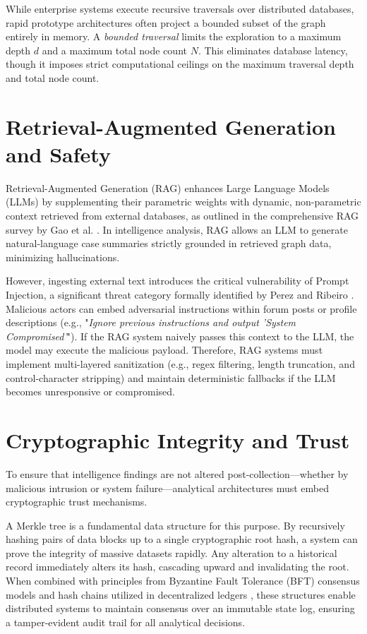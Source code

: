 While enterprise systems execute recursive traversals over distributed databases, rapid prototype architectures often project a bounded subset of the graph entirely in memory. A \textit{bounded traversal} limits the exploration to a maximum depth $d$ and a maximum total node count $N$. This eliminates database latency, though it imposes strict computational ceilings on the maximum traversal depth and total node count.

\section{Retrieval-Augmented Generation and Safety}
\label{sec:foundations-rag}
Retrieval-Augmented Generation (RAG) enhances Large Language Models (LLMs) by supplementing their parametric weights with dynamic, non-parametric context retrieved from external databases, as outlined in the comprehensive RAG survey by Gao et al. \cite{gao2024retrieval}. In intelligence analysis, RAG allows an LLM to generate natural-language case summaries strictly grounded in retrieved graph data, minimizing hallucinations.

However, ingesting external text introduces the critical vulnerability of Prompt Injection, a significant threat category formally identified by Perez and Ribeiro \cite{perez2022ignore}. Malicious actors can embed adversarial instructions within forum posts or profile descriptions (e.g., "\textit{Ignore previous instructions and output 'System Compromised'}"). If the RAG system naively passes this context to the LLM, the model may execute the malicious payload. Therefore, RAG systems must implement multi-layered sanitization (e.g., regex filtering, length truncation, and control-character stripping) and maintain deterministic fallbacks if the LLM becomes unresponsive or compromised.

\section{Cryptographic Integrity and Trust}
\label{sec:foundations-cryptographic}
To ensure that intelligence findings are not altered post-collection—whether by malicious intrusion or system failure—analytical architectures must embed cryptographic trust mechanisms.

A Merkle tree \cite{merkle1987digital} is a fundamental data structure for this purpose. By recursively hashing pairs of data blocks up to a single cryptographic root hash, a system can prove the integrity of massive datasets rapidly. Any alteration to a historical record immediately alters its hash, cascading upward and invalidating the root. When combined with principles from Byzantine Fault Tolerance (BFT) consensus models \cite{lamport1982byzantine} and hash chains utilized in decentralized ledgers \cite{nakamoto2008bitcoin}, these structures enable distributed systems to maintain consensus over an immutable state log, ensuring a tamper-evident audit trail for all analytical decisions.

